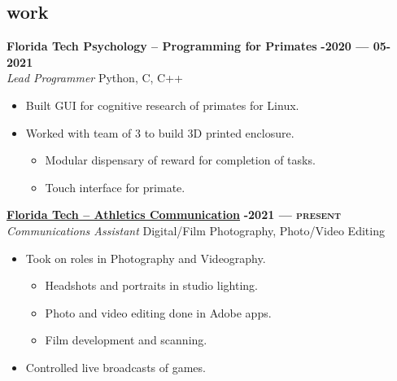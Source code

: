 \documentclass[margin,10pt]{res}
\begin{document}
\begin{resume}
    \section{\sc \lsstyle work}
        \textbf{Florida Tech Psychology -- Programming for Primates}
        \hfill
        \textsc{\bfseries{}-2020 --- 05-2021}
        \\
        \textit{Lead Programmer}
        \hfill
        Python, C, C++
        \vspace{0.5em}
        \begin{itemize}
            \item Built GUI for cognitive research of primates for Linux.
            \item Worked with team of 3 to build 3D printed enclosure.
            \begin{itemize}
                \item Modular dispensary of reward for completion of tasks.
                \item Touch interface for primate.
            \end{itemize}
        \end{itemize}

        \href{https://floridatechsports.com/}{\textbf{Florida Tech -- Athletics Communication}}
        \hfill
        \textsc{\bfseries{}-2021 --- present}
        \\
        \textit{Communications Assistant}
        \hfill
        Digital/Film Photography, Photo/Video Editing
        \vspace{0.5em}
        \begin{itemize}
            \item Took on roles in Photography and Videography.
            \begin{itemize}
                \item Headshots and portraits in studio lighting.
                \item Photo and video editing done in Adobe apps.
                \item Film development and scanning.
            \end{itemize}
            \item Controlled live broadcasts of games.
        \end{itemize}


\end{resume}
\end{document}

